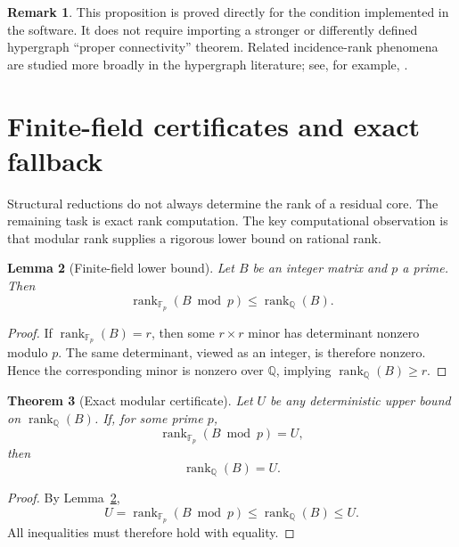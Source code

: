 \documentclass[11pt]{article}
\newtheorem{theorem}{Theorem}[section]
\newtheorem{lemma}[theorem]{Lemma}
\theoremstyle{definition}
\newtheorem{remark}[theorem]{Remark}
\newcommand{\Q}{\mathbb{Q}}
\newcommand{\F}{\mathbb{F}}
\newcommand{\rank}{\operatorname{rank}}
\newcommand{\1}{\mathbf{1}}
\begin{document}
\begin{remark}
This proposition is proved directly for the condition implemented in the software. It does not require importing a stronger or differently defined hypergraph ``proper connectivity'' theorem. Related incidence-rank phenomena are studied more broadly in the hypergraph literature; see, for example, \citet{Parui2025}.
\end{remark}

\section{Finite-field certificates and exact fallback}

Structural reductions do not always determine the rank of a residual core. The remaining task is exact rank computation. The key computational observation is that modular rank supplies a rigorous lower bound on rational rank.

\begin{lemma}[Finite-field lower bound]\label{lem:finitefield}
Let $B$ be an integer matrix and $p$ a prime. Then
\begin{equation}
  \rank_{\F_p}(B\bmod p)\le \rank_{\Q}(B).
  \label{eq:fplower}
\end{equation}
\end{lemma}

\begin{proof}
If $\rank_{\F_p}(B)=r$, then some $r\times r$ minor has determinant nonzero modulo $p$. The same determinant, viewed as an integer, is therefore nonzero. Hence the corresponding minor is nonzero over $\Q$, implying $\rank_{\Q}(B)\ge r$.
\end{proof}

\begin{theorem}[Exact modular certificate]\label{thm:certificate}
Let $U$ be any deterministic upper bound on $\rank_{\Q}(B)$. If, for some prime $p$,
\begin{equation}
  \rank_{\F_p}(B\bmod p)=U,
\end{equation}
then
\begin{equation}
  \rank_{\Q}(B)=U.
\end{equation}
\end{theorem}

\begin{proof}
By Lemma~\ref{lem:finitefield},
\begin{equation}
  U=\rank_{\F_p}(B\bmod p)\le\rank_{\Q}(B)\le U.
\end{equation}
All inequalities must therefore hold with equality.
\end{proof}
\end{document}
